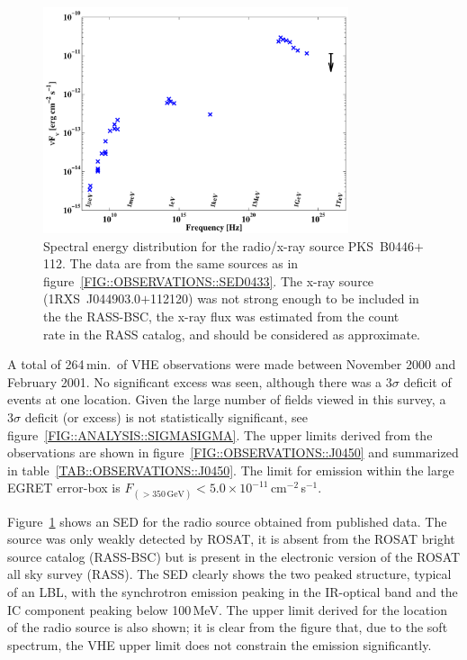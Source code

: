 \begin{figure}[p]
\centerline{\includegraphics[angle=270,width=0.8\textwidth]{plots/chap-observations/sed0450.pdf}}
\caption{\label{FIG::OBSERVATIONS::SED0450} Spectral energy 
distribution for the radio/x-ray source PKS~B0446$+$112. The data are from
the same sources as in figure~\ref{FIG::OBSERVATIONS::SED0433}.  The
x-ray source (1RXS~J044903.0$+$112120) was not strong enough to be
included in the the RASS-BSC, the x-ray flux was estimated from the
count rate in the RASS catalog, and should be considered as
approximate.}
\end{figure}

A total of 264\,min.\ of VHE observations were made between November
2000 and February 2001. No significant excess was seen, although there
was a $3\sigma$ deficit of events at one location. Given the large
number of fields viewed in this survey, a $3\sigma$ deficit (or
excess) is not statistically significant, see
figure~\ref{FIG::ANALYSIS::SIGMASIGMA}.  The upper limits derived from
the observations are shown in figure~\ref{FIG::OBSERVATIONS::J0450}
and summarized in table~\ref{TAB::OBSERVATIONS::J0450}. The limit for
emission within the large EGRET error-box is
$F_{(>350\,\mathrm{GeV})}<5.0\times10^{-11}$\,cm$^{-2}$\,s$^{-1}$.

Figure~\ref{FIG::OBSERVATIONS::SED0450} shows an SED for the radio
source obtained from published data. The source was only weakly
detected by ROSAT, it is absent from the ROSAT bright source catalog
(RASS-BSC) but is present in the electronic version of the ROSAT all
sky survey (RASS). The SED clearly shows the two peaked structure,
typical of an LBL, with the synchrotron emission peaking in the
IR-optical band and the IC component peaking below 100\,MeV. The upper
limit derived for the location of the radio source is also shown; it
is clear from the figure that, due to the soft spectrum, the VHE upper
limit does not constrain the emission significantly.

